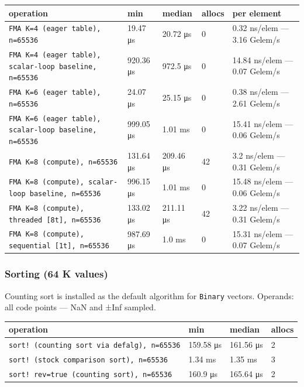 \begin{table}[h]
\centering
\begin{tabulary}{\linewidth}{L L L L L}
\toprule
operation & min & median & allocs & per element \\
\toprule
\texttt{FMA K=4 (\allowbreak{}eager table), n=65536} & 19.47 μs & 20.72 μs & 0 & 0.32 ns/elem — 3.16 Gelem/s \\
\texttt{FMA K=4 (\allowbreak{}eager table), scalar-loop baseline, n=65536} & 920.36 μs & 972.5 μs & 0 & 14.84 ns/elem — 0.07 Gelem/s \\
\texttt{FMA K=6 (\allowbreak{}eager table), n=65536} & 24.07 μs & 25.15 μs & 0 & 0.38 ns/elem — 2.61 Gelem/s \\
\texttt{FMA K=6 (\allowbreak{}eager table), scalar-loop baseline, n=65536} & 999.05 μs & 1.01 ms & 0 & 15.41 ns/elem — 0.06 Gelem/s \\
\texttt{FMA K=8 (\allowbreak{}compute), n=65536} & 131.64 μs & 209.46 μs & 42 & 3.2 ns/elem — 0.31 Gelem/s \\
\texttt{FMA K=8 (\allowbreak{}compute), scalar-loop baseline, n=65536} & 996.15 μs & 1.01 ms & 0 & 15.48 ns/elem — 0.06 Gelem/s \\
\texttt{FMA K=8 (\allowbreak{}compute), threaded [8t], n=65536} & 133.02 μs & 211.11 μs & 42 & 3.22 ns/elem — 0.31 Gelem/s \\
\texttt{FMA K=8 (\allowbreak{}compute), sequential [1t], n=65536} & 987.69 μs & 1.0 ms & 0 & 15.31 ns/elem — 0.07 Gelem/s \\
\bottomrule
\end{tabulary}

\end{table}



\subsubsection{Sorting (64 K values)}



\label{10624969220324633770}{}


Counting sort is installed as the default algorithm for \texttt{Binary} vectors. Operands: all code points — NaN and ±Inf sampled.




\begin{table}[h]
\centering
\begin{tabulary}{\linewidth}{L L L L}
\toprule
operation & min & median & allocs \\
\toprule
\texttt{sort! (\allowbreak{}counting sort via defalg), n=65536} & 159.58 μs & 161.56 μs & 2 \\
\texttt{sort! (\allowbreak{}stock comparison sort), n=65536} & 1.34 ms & 1.35 ms & 3 \\
\texttt{sort! rev=true (\allowbreak{}counting sort), n=65536} & 160.9 μs & 165.64 μs & 2 \\
\bottomrule
\end{tabulary}

\end{table}



